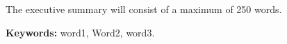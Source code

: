 
The executive summary will consist of a maximum of 250 words.

\vspace{1em}
\noindent\textbf{Keywords:} word1, Word2, word3.
